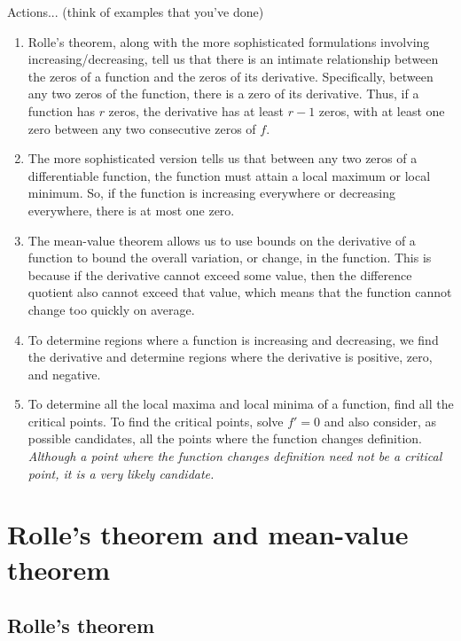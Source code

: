 \documentclass{amsart}
\begin{document}
\begin{enumerate}
\end{enumerate}

Actions... (think of examples that you've done)

\begin{enumerate}
\item Rolle's theorem, along with the more sophisticated formulations
  involving increasing/decreasing, tell us that there is an intimate
  relationship between the zeros of a function and the zeros of its
  derivative. Specifically, between any two zeros of the function,
  there is a zero of its derivative. Thus, if a function has $r$
  zeros, the derivative has at least $r - 1$ zeros, with at least one
  zero between any two consecutive zeros of $f$.
\item The more sophisticated version tells us that between any two
  zeros of a differentiable function, the function must attain a local
  maximum or local minimum. So, if the function is increasing
  everywhere or decreasing everywhere, there is at most one zero.
\item The mean-value theorem allows us to use bounds on the derivative
  of a function to bound the overall variation, or change, in the
  function. This is because if the derivative cannot exceed some
  value, then the difference quotient also cannot exceed that value,
  which means that the function cannot change too quickly on average.
\item To determine regions where a function is increasing and
  decreasing, we find the derivative and determine regions where the
  derivative is positive, zero, and negative.
\item To determine all the local maxima and local minima of a
  function, find all the critical points. To find the critical points,
  solve $f' = 0$ and also consider, as possible candidates, all the
  points where the function changes definition. {\em Although a point
  where the function changes definition need not be a critical point,
  it is a very likely candidate.}
\end{enumerate}

\section{Rolle's theorem and mean-value theorem}

\subsection{Rolle's theorem}
\end{document}
